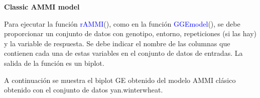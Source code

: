 \begin{itemize}[wide, nosep, labelindent = 0pt, topsep = 1ex, noitemsep,topsep=0pt]


\end{itemize}


\textbf{Classic AMMI model}

Para ejecutar la función \textcolor{blue}{rAMMI}(), como en la función \textcolor{blue}{GGEmodel}(), se debe proporcionar un conjunto de datos con genotipo, entorno, repeticiones (si las hay) y la variable de respuesta. Se debe indicar el nombre de las columnas que contienen cada una de estas variables en el conjunto de datos de entradas. La salida de la función es un biplot.

A continuación se muestra el biplot GE obtenido del modelo AMMI clásico obtenido con el conjunto de datos yan.winterwheat.

